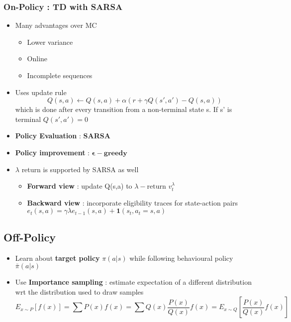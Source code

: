 \documentclass[12pt]{article} %
\begin{document}
\subsubsection{On-Policy : TD with SARSA}
\begin{itemize}
\item Many advantages over MC
\begin{itemize}
\item Lower variance
\item Online
\item Incomplete sequences
\end{itemize}
\item Uses update rule 
$$ Q(s,a) \leftarrow Q(s,a) 	+ \alpha(r+ \gamma Q(s',a')-Q(s,a))$$
which is done after every transition from a non-terminal state s. If s' is terminal $Q(s',a') = 0$
\begin{center}
\end{center}

\item \textbf{Policy Evaluation} : \textbf{SARSA}
\item \textbf{Policy improvement} : $\bm{\epsilon-greedy}$ 

\item  $\lambda$ return is supported by SARSA as well
\begin{itemize}
\item \textbf{Forward view} : update Q(s,a) to $\lambda-\text{return } v_t^{\lambda}$ 
\item \textbf{Backward view} : incorporate eligibility traces for state-action pairs
$e_t(s,a)= \gamma \lambda e_{t-1}(s,a) +\bm{1}(s_t,a_t = s,a)$ 
\end{itemize}
\end{itemize}

\subsection{Off-Policy}
\begin{itemize}
\item Learn about \textbf{target policy} $\pi(a|s)$ while following behavioural policy $\bar{\pi}(a|s)$
\item Use \textbf{Importance sampling} : estimate expectation of a different distribution wrt the distribution used to draw samples
$$ E_{x \sim P}[f(x)] = \sum P(x)f(x) = \sum Q(x)\frac{P(x)}{Q(x)}f(x)= E_{x \sim Q}[\frac{P(x)}{Q(x)}f(x)]$$
\end{itemize}
\end{document}
